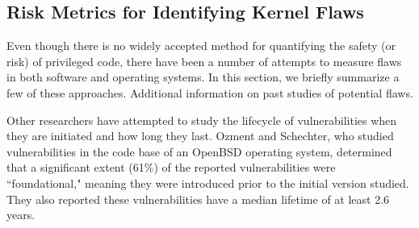 








\subsection{Risk Metrics for Identifying Kernel Flaws}

Even though there is no widely accepted method for
quantifying the safety (or risk) of privileged code, there have been a number of
attempts to measure flaws in both software and operating systems. In this section,
we briefly summarize a few of these approaches. Additional information on
past studies of potential flaws.



Other researchers have attempted to study the lifecycle of vulnerabilities when they are
initiated and how long they last. Ozment and Schechter, who studied vulnerabilities in the code base of an OpenBSD operating system, determined that a significant extent (61\%) of the reported
vulnerabilities were ``foundational," meaning they were introduced prior to the
initial version studied. They also reported these vulnerabilities
have a median lifetime of at least 2.6 years.

